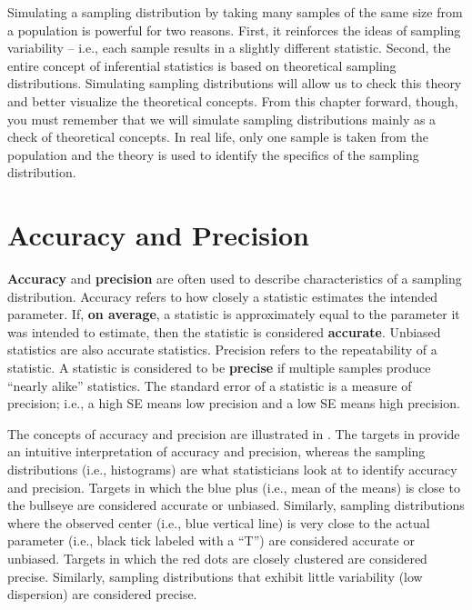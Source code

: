 \documentclass[10pt,openany]{book}\usepackage[]{graphicx}\usepackage[]{color}
\begin{document}
Simulating a sampling distribution by taking many samples of the same size from a population is powerful for two reasons.  First, it reinforces the ideas of sampling variability -- i.e., each sample results in a slightly different statistic.  Second, the entire concept of inferential statistics is based on theoretical sampling distributions.  Simulating sampling distributions will allow us to check this theory and better visualize the theoretical concepts.  From this chapter forward, though, you must remember that we will simulate sampling distributions mainly as a check of theoretical concepts.  In real life, only one sample is taken from the population and the theory is used to identify the specifics of the sampling distribution.



\section{Accuracy and Precision}
\vspace{-12pt}
\textbf{Accuracy} and \textbf{precision} are often used to describe characteristics of a sampling distribution.  Accuracy refers to how closely a statistic estimates the intended parameter.  If, \textbf{on average}, a statistic is approximately equal to the parameter it was intended to estimate, then the statistic is considered \textbf{accurate}.  Unbiased statistics are also accurate statistics.  Precision refers to the repeatability of a statistic.  A statistic is considered to be \textbf{precise} if multiple samples produce ``nearly alike'' statistics.  The standard error of a statistic is a measure of precision; i.e., a high SE means low precision and a low SE means high precision.

The concepts of accuracy and precision are illustrated in .  The targets in  provide an intuitive interpretation of accuracy and precision, whereas the sampling distributions (i.e., histograms) are what statisticians look at to identify accuracy and precision.  Targets in which the blue plus (i.e., mean of the means) is close to the bullseye are considered accurate or unbiased.  Similarly, sampling distributions where the observed center (i.e., blue vertical line) is very close to the actual parameter (i.e., black tick labeled with a ``T'') are considered accurate or unbiased.  Targets in which the red dots are closely clustered are considered precise.  Similarly, sampling distributions that exhibit little variability (low dispersion) are considered precise.
\end{document}
